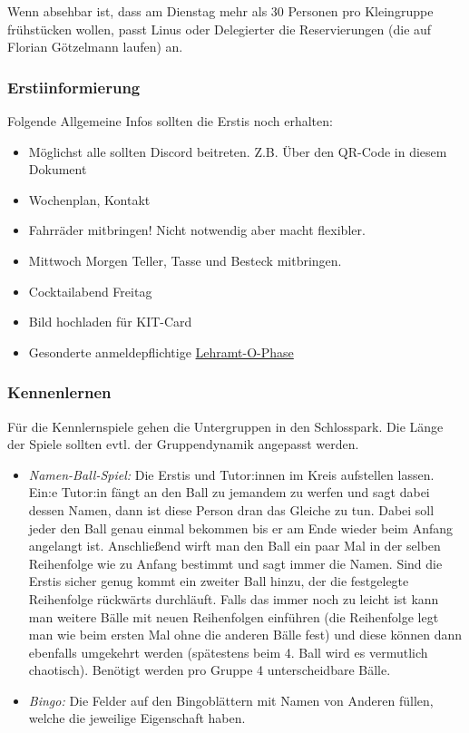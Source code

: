 \documentclass[10pt,ngerman]{scrartcl}
\begin{document}
\begin{multicols}{2}
Wenn absehbar ist, dass am Dienstag mehr als 30 Personen pro Kleingruppe frühstücken wollen, passt Linus oder Delegierter die Reservierungen (die auf Florian Götzelmann laufen) an.


\subsubsection{Erstiinformierung}

Folgende Allgemeine Infos sollten die Erstis noch erhalten:
\begin{itemize} 
    \item Möglichst alle sollten Discord beitreten. Z.B. Über den QR-Code in
        diesem Dokument
    \item Wochenplan, Kontakt 
    \item Fahrräder mitbringen! Nicht notwendig aber macht flexibler.
    \item Mittwoch Morgen Teller, Tasse und Besteck mitbringen.  
    \item Cocktailabend Freitag 
    \item Bild hochladen für KIT-Card 
    \item Gesonderte anmeldepflichtige \hyperref[lehramt]{Lehramt-O-Phase}
\end{itemize} 

\subsubsection{Kennenlernen}

Für die Kennlernspiele gehen die Untergruppen in den Schlosspark. Die Länge der
Spiele sollten evtl. der Gruppendynamik angepasst werden.  
\begin{itemize}
    \item \emph{Namen-Ball-Spiel:} Die Erstis und Tutor:innen im  Kreis
        aufstellen lassen.  Ein:e Tutor:in fängt an den Ball zu jemandem zu
        werfen und sagt dabei dessen Namen,  dann ist diese Person dran das
        Gleiche zu tun. Dabei soll jeder den Ball genau einmal bekommen bis er
        am Ende wieder beim Anfang angelangt ist. Anschließend wirft man den
        Ball ein paar Mal in der selben Reihenfolge wie zu Anfang bestimmt und
        sagt immer die Namen. Sind die Erstis sicher genug kommt ein zweiter
        Ball hinzu, der die festgelegte Reihenfolge rückwärts durchläuft.
        Falls das immer noch zu leicht ist kann man weitere Bälle mit neuen
        Reihenfolgen einführen (die Reihenfolge legt man wie beim ersten Mal
        ohne die anderen Bälle fest) und diese können dann ebenfalls umgekehrt
        werden (spätestens beim 4. Ball wird es vermutlich chaotisch). Benötigt
        werden pro Gruppe 4 unterscheidbare Bälle.
    \item \emph{Bingo:} 
        Die Felder auf den Bingoblättern mit Namen von
        Anderen füllen, welche die jeweilige Eigenschaft haben.


\end{itemize}
\end{multicols}
\end{document}
